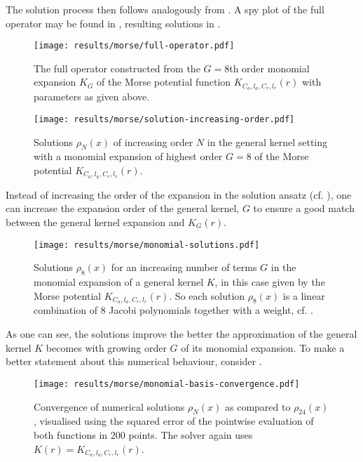 The solution process then follows analogously from .
A spy plot of the full operator may be found in , resulting solutions in .

\begin{figure}[H]
  \centering
  \texttt{[image: results/morse/full-operator.pdf]}
  \caption[Full Morse operator]{The full operator constructed from the $G=8$th order monomial expansion $K_G$ of the Morse potential function $K_{C_a, l_a, C_r, l_r}(r)$ with parameters as given above.}
  \label{fig:morse-operator}
\end{figure}

\begin{figure}[H]
  \centering
  \texttt{[image: results/morse/solution-increasing-order.pdf]}
  \caption[General kernel solutions of increasing order]{Solutions $\rho_N(x)$ of increasing order $N$ in the general kernel setting with a monomial expansion of highest order $G = 8$ of the Morse potential $K_{C_a, l_a, C_r, l_r}(r)$.}
  \label{fig:morse-solution-increasing-order}
\end{figure}

Instead of increasing the order of the expansion in the solution ansatz (cf. ), one can increase the expansion order of the general kernel, $G$ to ensure a good match between the general kernel expansion and $K_G(r)$.

\begin{figure}[H]
  \centering
  \texttt{[image: results/morse/monomial-solutions.pdf]}
  \caption[General kernel solutions with varying $G$]{Solutions $\rho_8(x)$ for an increasing number of terms $G$ in the monomial expansion of a general kernel $K$, in this case given by the Morse potential $K_{C_a, l_a, C_r, l_r}(r)$. So each solution $\rho_8(x)$ is a linear combination of $8$ Jacobi polynomials together with a weight, cf. .}
  \label{fig:monomial-solutions}
\end{figure}

As one can see, the solutions improve the better the approximation of the general kernel $K$ becomes with growing order $G$ of its monomial expansion.
To make a better statement about this numerical behaviour, consider .

\begin{figure}[H]
  \centering
  \texttt{[image: results/morse/monomial-basis-convergence.pdf]}
  \caption[Step-by-step convergence of solutions when increasing the degree of the monomial]{
    Convergence of numerical solutions $\rho_N(x)$ as compared to $\rho_{24}(x)$, visualised using the squared error of the pointwise evaluation of both functions in $200$ points.
    The solver again uses $K(r) = K_{C_a, l_a, C_r, l_r}(r)$.
  }
  \label{fig:monomial-basis-convergence}
\end{figure}

